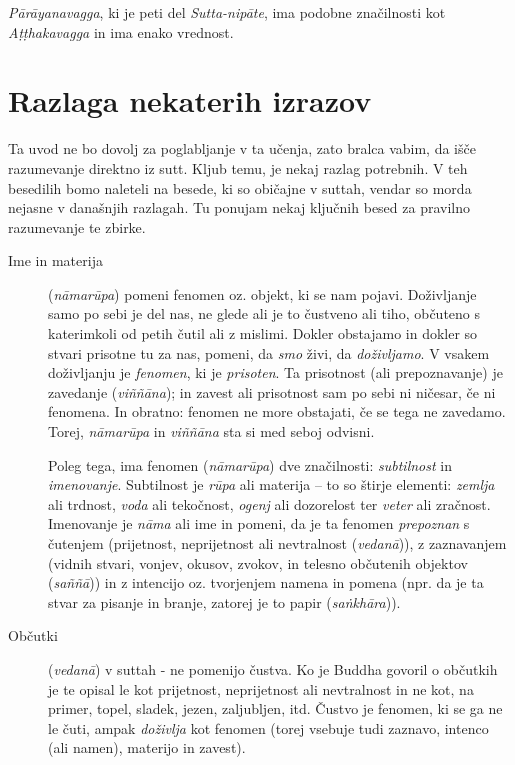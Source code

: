 \emph{Pārāyanavagga}, ki je peti del \emph{Sutta-nipāte}, ima podobne
značilnosti kot \emph{Aṭṭhakavagga} in ima enako vrednost.

\chapter{Razlaga nekaterih izrazov}

Ta uvod ne bo dovolj za poglabljanje v ta učenja, zato bralca vabim, da
išče razumevanje direktno iz sutt. Kljub temu, je nekaj razlag
potrebnih. V teh besedilih bomo naleteli na besede, ki so običajne v
suttah, vendar so morda nejasne v današnjih razlagah. Tu ponujam nekaj
ključnih besed za pravilno razumevanje te zbirke.

\begin{description}

\item[Ime in materija] (\emph{nāmarūpa}) pomeni fenomen oz. objekt,
ki se nam pojavi. Doživljanje samo po sebi je del nas, ne glede ali je
to čustveno ali tiho, občuteno s katerimkoli od petih čutil ali z
mislimi. Dokler obstajamo in dokler so stvari prisotne tu za nas,
pomeni, da \emph{smo} živi, da \emph{doživljamo}. V vsakem doživljanju
je \emph{fenomen}, ki je \emph{prisoten}. Ta prisotnost (ali
prepoznavanje) je zavedanje (\emph{viññāna}); in zavest ali prisotnost
sam po sebi ni ničesar, če ni fenomena. In obratno: fenomen ne more
obstajati, če se tega ne zavedamo. Torej, \emph{nāmarūpa} in
\emph{viññāna} sta si med seboj odvisni.

Poleg tega, ima fenomen (\emph{nāmarūpa}) dve značilnosti:
\emph{subtilnost} in \emph{imenovanje}. Subtilnost je \emph{rūpa} ali
materija -- to so štirje elementi: \emph{zemlja} ali trdnost,
\emph{voda} ali tekočnost, \emph{ogenj} ali dozorelost ter \emph{veter}
ali zračnost. Imenovanje je \emph{nāma} ali ime in pomeni, da je ta
fenomen \emph{prepoznan} s čutenjem (prijetnost, neprijetnost ali
nevtralnost (\emph{vedanā})), z zaznavanjem (vidnih stvari, vonjev,
okusov, zvokov, in telesno občutenih objektov (\emph{saññā})) in z
intencijo oz. tvorjenjem namena in pomena (npr. da je ta stvar za
pisanje in branje, zatorej je to papir (\emph{saṅkhāra})).

\item[Občutki] (\emph{vedanā}) v suttah - ne pomenijo čustva. Ko je
Buddha govoril o občutkih je te opisal le kot prijetnost, neprijetnost
ali nevtralnost in ne kot, na primer, topel, sladek, jezen, zaljubljen,
itd. Čustvo je fenomen, ki se ga ne le čuti, ampak \emph{doživlja} kot
fenomen (torej vsebuje tudi zaznavo, intenco (ali namen), materijo in
zavest).


\end{description}
